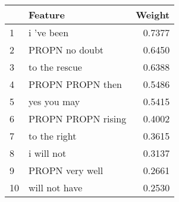 \begin{tabular}{llr}
\toprule
{} &             Feature &  Weight \\
\midrule
1  &          i 've been &  0.7377 \\
2  &      PROPN no doubt &  0.6450 \\
3  &       to the rescue &  0.6388 \\
4  &    PROPN PROPN then &  0.5486 \\
5  &         yes you may &  0.5415 \\
6  &  PROPN PROPN rising &  0.4002 \\
7  &        to the right &  0.3615 \\
8  &          i will not &  0.3137 \\
9  &     PROPN very well &  0.2661 \\
10 &       will not have &  0.2530 \\
\bottomrule
\end{tabular}
